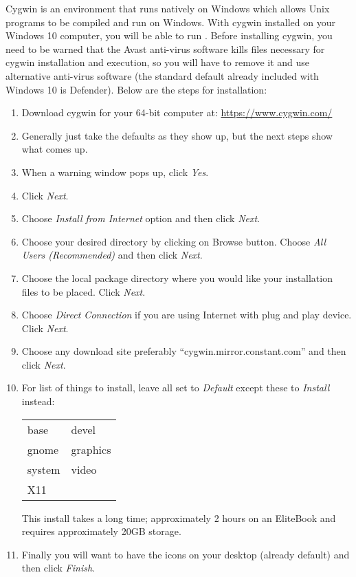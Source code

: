 Cygwin is an environment that runs natively on Windows which
allows Unix programs to be compiled and run on Windows.  With
cygwin installed on your Windows 10 computer, you will be able to
run \CGG{}.  Before installing cygwin, you need to be warned that
the Avast anti-virus software kills files necessary for cygwin
installation and execution, so you will have to remove it and use
alternative anti-virus software (the standard default already
included with Windows 10 is Defender). Below are the steps for
installation:

\begin{enumerate}
\item Download cygwin for your 64-bit computer at:
  \href{https://www.cygwin.com/}{https://www.cygwin.com/}

\item Generally just take the defaults as they show up, but the
  next steps show what comes up.

\item When a warning window pops up, click \textit{Yes}.

\item Click \textit{Next}.

\item Choose \textit{Install from Internet} option and then click
  \textit{Next}.

\item Choose your desired directory by clicking on Browse
  button. Choose \textit{All Users (Recommended)} and then click
  \textit{Next}.

\item Choose the local package directory where you would like your
  installation files to be placed. Click \textit{Next}.

\item Choose \textit{Direct Connection} if you are using Internet
  with plug and play device. Click \textit{Next}.

\item Choose any download site preferably
  ``cygwin.mirror.constant.com'' and then click \textit{Next}.

\item For list of things to install, leave all set to
  \textit{Default} except these to \textit{Install} instead:

  \begin{tabular}{ll}
    base& devel\\
    gnome& graphics\\
    system& video\\
    X11
  \end{tabular}

  This install takes a long time; approximately 2 hours on an
  EliteBook and requires approximately 20GB storage.

\item Finally you will want to have the icons on your desktop
  (already default) and then click \textit{Finish}.
\end{enumerate}


